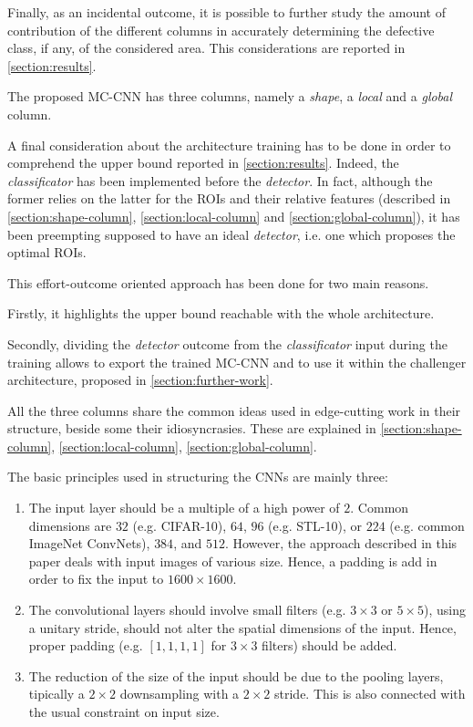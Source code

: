     \par{
        Finally, as an incidental outcome, it is possible to further study the amount of contribution of the different columns in accurately determining the defective class, if any, of the considered area. This considerations are reported in \ref{section:results}.
    }
    \par{
        The proposed MC-CNN has three columns, namely a \emph{shape}, a \emph{local} and a \emph{global} column.
    }
    \par{
        A final consideration about the architecture training has to be done in order to comprehend the upper bound reported in \ref{section:results}. Indeed, the \emph{classificator} has been implemented before the \emph{detector}. In fact, although the former relies on the latter for the ROIs and their relative features (described in \ref{section:shape-column}, \ref{section:local-column} and \ref{section:global-column}), it has been preempting supposed to have an ideal \emph{detector}, i.e. one which proposes the optimal ROIs.
    }
    \par{
        This effort-outcome oriented approach has been done for two main reasons.
    }
    \par{
        Firstly, it highlights the upper bound reachable with the whole architecture.
    }
    \par{
        Secondly, dividing the \emph{detector} outcome from the \emph{classificator} input during the training allows to export the trained MC-CNN and to use it within the challenger architecture, proposed in \ref{section:further-work}.
    }
    \par{
        All the three columns share the common ideas used in edge-cutting work \cite{stanford:cs231n} in their structure, beside some their idiosyncrasies. These are explained in \ref{section:shape-column}, \ref{section:local-column}, \ref{section:global-column}.
    }
    \par{
        The basic principles used in structuring the CNNs are mainly three:
        \begin{enumerate}
            \item The input layer should be a multiple of a high power of $2$. Common dimensions are $32$ (e.g. CIFAR-10), $64$, $96$ (e.g. STL-10), or $224$ (e.g. common ImageNet ConvNets), $384$, and $512$. However, the approach described in this paper deals with input images of various size. Hence, a padding is add in order to fix the input to $1600\times 1600$.
            \item The convolutional layers should involve small filters (e.g. $3\times 3$ or $5\times5$), using a unitary stride, should not alter the spatial dimensions of the input. Hence, proper padding (e.g. $\left[1,1,1,1\right]$ for $3\times 3$ filters) should be added.
            \item The reduction of the size of the input should be due to the pooling layers, tipically a $2\times 2$ downsampling with a $2\times 2$ stride. This is also connected with the usual constraint on input size.
        \end{enumerate}
    }
